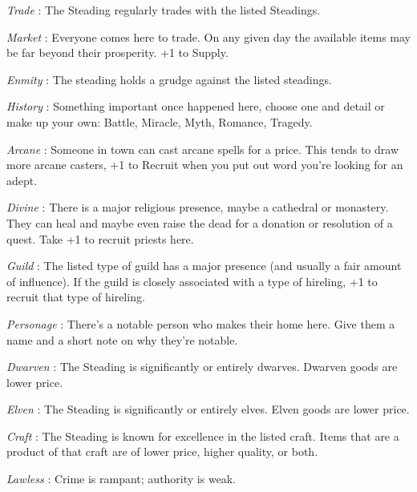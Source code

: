          {\em Trade} : The Steading regularly trades with the listed Steadings.

       

         {\em Market} : Everyone comes here to trade. On any given day the available items may be far beyond their prosperity. +1 to Supply.

       

         {\em Enmity} : The steading holds a grudge against the listed steadings.

       

         {\em History} : Something important once happened here, choose one and detail or make up your own: Battle, Miracle, Myth, Romance, Tragedy.

       

         {\em Arcane} : Someone in town can cast arcane spells for a price. This tends to draw more arcane casters, +1 to Recruit when you put out word you're looking for an adept.

       

         {\em Divine} : There is a major religious presence, maybe a cathedral or monastery. They can heal and maybe even raise the dead for a donation or resolution of a quest. Take +1 to recruit priests here.

       

         {\em Guild} : The listed type of guild has a major presence (and usually a fair amount of influence). If the guild is closely associated with a type of hireling, +1 to recruit that type of hireling.

       

         {\em Personage} : There's a notable person who makes their home here. Give them a name and a short note on why they're notable.

       

         {\em Dwarven} : The Steading is significantly or entirely dwarves. Dwarven goods are lower price.

       

         {\em Elven} : The Steading is significantly or entirely elves. Elven goods are lower price.

       

         {\em Craft} : The Steading is known for excellence in the listed craft. Items that are a product of that craft are of lower price, higher quality, or both.

       

         {\em Lawless} : Crime is rampant; authority is weak.

